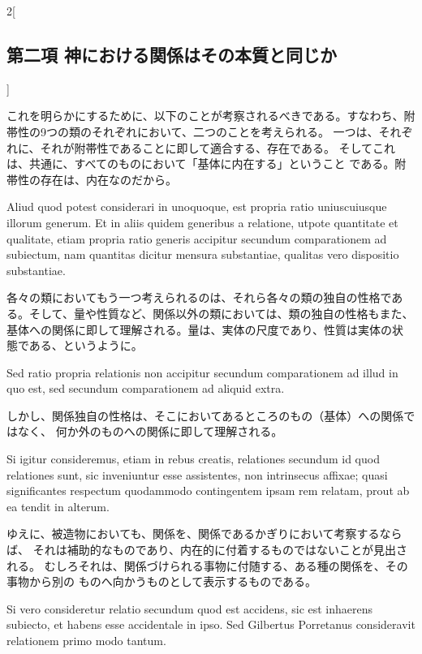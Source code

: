 \documentclass[paper=a4paper,fontsize=10pt,jafontsize=9pt,titlepage]{jlreq}
\begin{document}
\begin{paracol}{2}[\subsection{第二項 神における関係はその本質と同じか}]
\switchcolumn


これを明らかにするために、以下のことが考察されるべきである。すなわち、附
 帯性の9つの類のそれぞれにおいて、二つのことを考えられる。
一つは、それぞれに、それが附帯性であることに即して適合する、存在である。
 そしてこれは、共通に、すべてのものにおいて「基体に内在する」ということ
 である。附帯性の存在は、内在なのだから。


\switchcolumn*


Aliud
quod potest considerari in unoquoque, est propria ratio uniuscuiusque
illorum generum. Et in aliis quidem generibus a relatione, utpote
quantitate et qualitate, etiam propria ratio generis accipitur secundum
comparationem ad subiectum, nam quantitas dicitur mensura substantiae,
qualitas vero dispositio substantiae.


\switchcolumn


各々の類においてもう一つ考えられるのは、それら各々の類の独自の性格であ
 る。そして、量や性質など、関係以外の類においては、類の独自の性格もまた、
 基体への関係に即して理解される。量は、実体の尺度であり、性質は実体の状
 態である、というように。


\switchcolumn*


Sed ratio propria relationis non
accipitur secundum comparationem ad illud in quo est, sed secundum
comparationem ad aliquid extra.


\switchcolumn


しかし、関係独自の性格は、そこにおいてあるところのもの（基体）への関係ではなく、
 何か外のものへの関係に即して理解される。


\switchcolumn*


Si igitur consideremus, etiam in rebus
creatis, relationes secundum id quod relationes sunt, sic inveniuntur
esse assistentes, non intrinsecus affixae; quasi significantes respectum
quodammodo contingentem ipsam rem relatam, prout ab ea tendit in
alterum.


\switchcolumn


ゆえに、被造物においても、関係を、関係であるかぎりにおいて考察するならば、
それは補助的なものであり、内在的に付着するものではないことが見出される。
むしろそれは、関係づけられる事物に付随する、ある種の関係を、その事物から別の
 ものへ向かうものとして表示するものである。


\switchcolumn*


Si vero consideretur relatio secundum quod est accidens, sic
est inhaerens subiecto, et habens esse accidentale in ipso. Sed
Gilbertus Porretanus consideravit relationem primo modo tantum.



\end{paracol}
\end{document}
